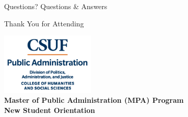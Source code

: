 \documentclass[10pt]{beamer}
\begin{document}
\begin{frame}{Questions?}
\centering
Questions \& Answers

\end{frame}

\begin{frame}{Thank You for Attending}
    \begin{center}
    \includegraphics[height=3cm]{images/PUBLIC-ADMINISTRATION-color.png} \\
    \vspace{1cm}
    \textbf{Master of Public Administration (MPA) Program}\\
    \textbf{New Student Orientation}
    \end{center}
    \end{frame}
    
\end{document}
